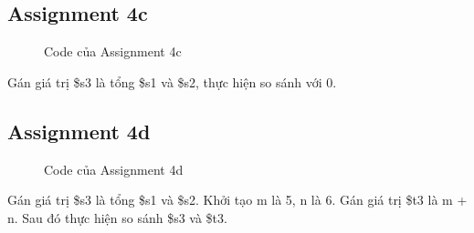 \documentclass[a4paper,12pt]{article}
\begin{document}
\subsection{Assignment 4c}
\begin{figure}[!h]
	\centerline{}
	\caption{Code của Assignment 4c}
	\label{fig:ass4c}
\end{figure}
\noindent
Gán giá trị \$s3 là tổng \$s1 và \$s2, thực hiện so sánh với 0. \\ 
\clearpage
\newpage
\subsection{Assignment 4d}
\begin{figure}[!h]
	\centerline{}
	\caption{Code của Assignment 4d}
	\label{fig:ass4d}
\end{figure}
\noindent
Gán giá trị \$s3 là tổng \$s1 và \$s2. Khởi tạo m là 5, n là 6. Gán giá trị \$t3 là m + n. Sau đó thực hiện so sánh \$s3 và \$t3. \\
\clearpage
\newpage
\end{document}
